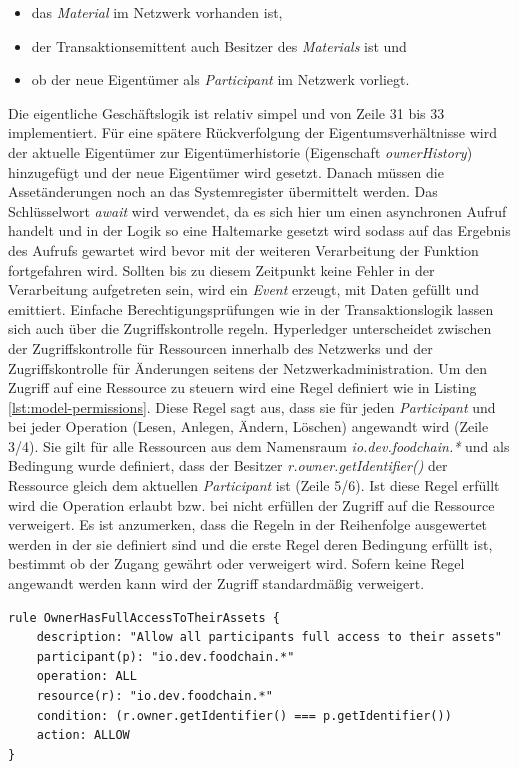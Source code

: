 \begin{itemize}
    \item das \textit{Material} im Netzwerk vorhanden ist,
    \item der Transaktionsemittent auch Besitzer des \textit{Materials} ist und
    \item ob der neue Eigentümer als \textit{Participant} im Netzwerk vorliegt.
\end{itemize}

\noindent
Die eigentliche Geschäftslogik ist relativ simpel und von Zeile 31 bis 33 implementiert. Für eine spätere Rückverfolgung der Eigentumsverhältnisse wird der aktuelle Eigentümer zur Eigentümerhistorie (Eigenschaft \textit{ownerHistory}) hinzugefügt und der neue Eigentümer wird gesetzt. Danach müssen die Assetänderungen noch an das Systemregister übermittelt werden. Das Schlüsselwort \textit{await} wird verwendet, da es sich hier um einen asynchronen Aufruf handelt und in der Logik so eine Haltemarke gesetzt wird sodass auf das Ergebnis des Aufrufs gewartet wird bevor mit der weiteren Verarbeitung der Funktion fortgefahren wird. Sollten bis zu diesem Zeitpunkt keine Fehler in der Verarbeitung aufgetreten sein, wird ein \textit{Event} erzeugt, mit Daten gefüllt und emittiert. Einfache Berechtigungsprüfungen wie in der Transaktionslogik lassen sich auch über die Zugriffskontrolle regeln. Hyperledger unterscheidet zwischen der Zugriffskontrolle für Ressourcen innerhalb des Netzwerks und der Zugriffskontrolle für Änderungen seitens der Netzwerkadministration. Um den Zugriff auf eine Ressource zu steuern wird eine Regel definiert wie in Listing \ref{lst:model-permissions}. Diese Regel sagt aus, dass sie für jeden \textit{Participant} und bei jeder Operation (Lesen, Anlegen, Ändern, Löschen) angewandt wird (Zeile 3/4). Sie gilt für alle Ressourcen aus dem Namensraum \textit{io.dev.foodchain.*} und als Bedingung wurde definiert, dass der Besitzer \textit{r.owner.getIdentifier()} der Ressource gleich dem aktuellen \textit{Participant} ist (Zeile 5/6). Ist diese Regel erfüllt wird die Operation erlaubt bzw. bei nicht erfüllen der Zugriff auf die Ressource verweigert. Es ist anzumerken, dass die Regeln in der Reihenfolge ausgewertet werden in der sie definiert sind und die erste Regel deren Bedingung erfüllt ist, bestimmt ob der Zugang gewährt oder verweigert wird. Sofern keine Regel angewandt werden kann wird der Zugriff standardmäßig verweigert.

\begin{lstlisting}[caption={Berechtigungsdefinition},label=lst:model-permissions]
rule OwnerHasFullAccessToTheirAssets {
    description: "Allow all participants full access to their assets"
    participant(p): "io.dev.foodchain.*"
    operation: ALL
    resource(r): "io.dev.foodchain.*"
    condition: (r.owner.getIdentifier() === p.getIdentifier())
    action: ALLOW
}
\end{lstlisting}

